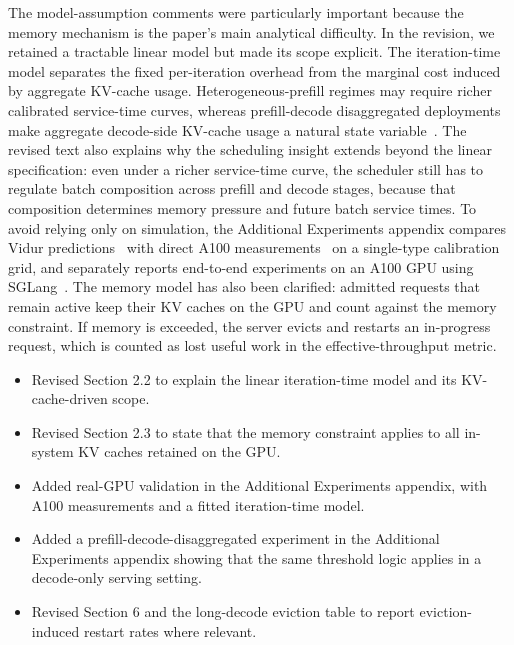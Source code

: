 
\response The model-assumption comments were particularly important because the memory mechanism is the paper's main analytical difficulty. In the revision, we retained a tractable linear model but made its scope explicit. The iteration-time model separates the fixed per-iteration overhead from the marginal cost induced by aggregate KV-cache usage. Heterogeneous-prefill regimes may require richer calibrated service-time curves, whereas prefill-decode disaggregated deployments make aggregate decode-side KV-cache usage a natural state variable~\citep{patel2024splitwise,zhong2024distserve}. The revised text also explains why the scheduling insight extends beyond the linear specification: even under a richer service-time curve, the scheduler still has to regulate batch composition across prefill and decode stages, because that composition determines memory pressure and future batch service times. To avoid relying only on simulation, the Additional Experiments appendix compares Vidur predictions~\citep{agrawal2024vidur} with direct A100 measurements~\citep{nvidia-a100-specs} on a single-type calibration grid, and separately reports end-to-end experiments on an A100 GPU using SGLang~\citep{sglang-github}. The memory model has also been clarified: admitted requests that remain active keep their KV caches on the GPU and count against the memory constraint. If memory is exceeded, the server evicts and restarts an in-progress request, which is counted as lost useful work in the effective-throughput metric.

\changes
\begin{itemize}
    \item Revised Section 2.2 to explain the linear iteration-time model and its KV-cache-driven scope.
    \item Revised Section 2.3 to state that the memory constraint applies to all in-system KV caches retained on the GPU.
    \item Added real-GPU validation in the Additional Experiments appendix, with A100 measurements and a fitted iteration-time model.
    \item Added a prefill-decode-disaggregated experiment in the Additional Experiments appendix showing that the same threshold logic applies in a decode-only serving setting.
    \item Revised Section 6 and the long-decode eviction table to report eviction-induced restart rates where relevant.
\end{itemize}

